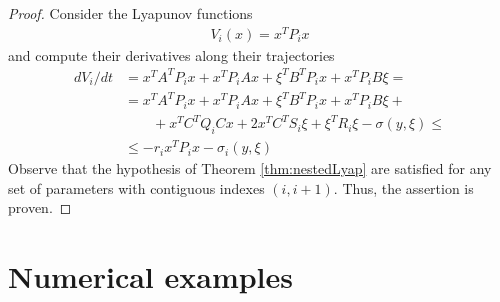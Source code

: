 \documentclass[letterpaper,10pt,twocolumn,journal,final]{IEEEtran}
\begin{document}
\begin{proof}
	Consider the Lyapunov functions
	\begin{align}
		V_i(x)=x^T P_i x
	\end{align}
	and compute their derivatives along their trajectories
	\begin{align*}
		dV_i/dt&=x^TA^TP_ix+x^TP_iAx+\xi^T B^T P_i x + x^T P_i B\xi=\\
			&=x^TA^TP_i x+x^TP_i Ax+\xi^T B^T P_i x + x^T P_i B\xi+\\
			&\qquad +x^TC^TQ_i Cx+2x^TC^TS_i\xi+\xi^TR_i\xi-\sigma(y,\xi)\leq\\
			&\leq -r_i x^TP_i x -\sigma_i(y,\xi)
	\end{align*}
	Observe that the hypothesis of Theorem \ref{thm:nestedLyap} are satisfied for any set of parameters with contiguous indexes $(i, i+1)$. Thus, the assertion is proven.
\end{proof}

\section{Numerical examples}\label{sec:numerical examples}
\end{document}
